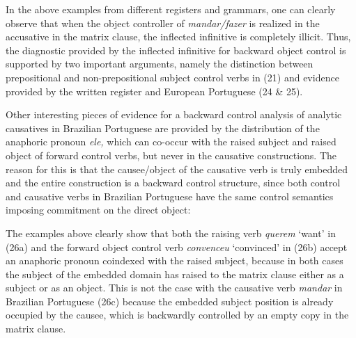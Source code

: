 \documentclass[output=paper]{langsci/langscibook}
\begin{document}
In the above examples from different registers and grammars, one can clearly observe that when the object controller of \textit{mandar\slash fazer}\textbf{ }is realized in the accusative in the matrix clause, the inflected infinitive is completely illicit. Thus, the diagnostic provided by the inflected infinitive for backward object control is supported by two important arguments, namely the distinction between prepositional and non{}-prepositional subject control verbs in (21) and evidence provided by the written register and European Portuguese (24 \& 25).

Other interesting pieces of evidence for a backward control analysis of analytic causatives in Brazilian Portuguese are provided by the distribution of the anaphoric pronoun \textit{ele,} which can co-occur with the raised subject and raised object of forward control verbs, but never in the causative constructions. The reason for this is that the causee\slash object of the causative verb is truly embedded and the entire construction is a backward control structure, since both control and causative verbs in Brazilian Portuguese have the same control semantics imposing commitment on the direct object:

\ea%
    \label{ex:moreno:26}
    \z
\z
    
The examples above clearly show that both the raising verb \textit{querem} ‘want’ in (26a) and the forward object control verb \textit{convenceu} ‘convinced’ in (26b) accept an anaphoric pronoun coindexed with the raised subject, because in both cases the subject of the embedded domain has raised to the matrix clause either as a subject or as an object. This is not the case with the causative verb \textit{mandar} in Brazilian Portuguese (26c) because the embedded subject position is already occupied by the causee, which is backwardly controlled by an empty copy in the matrix clause. 
\end{document}
